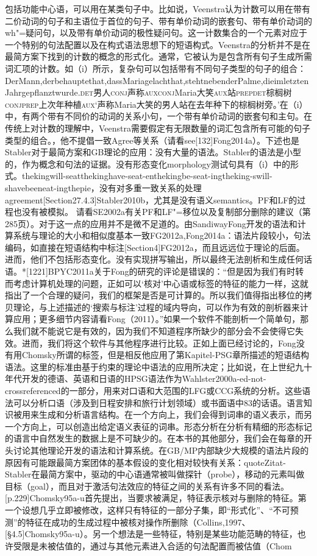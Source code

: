 包括功能中心语，可以用在某类句子中。比如说，Veenstra认为计数可以用在带有二价动词的句子和主语位于首位的句子、带有单价动词的嵌套句、带有单价动词的wh"=疑问句，以及带有单价动词的极性疑问句。这一计数集合的一个元素对应于一个特别的句法配置以及在构式语法思想下的短语构式。Veenstra的分析并不是在最简方案下找到的计数的概念的形式化。通常，它被认为是包含所有句子生成所需词汇项的计数。如（i）所示，复杂句可以包括带有不同句子类型的句子的组合：DerMann,derbehauptethat,dassMariagelachthat,stehtnebenderPalme,dieimletztenJahrgepflanztwurde.\textsc{det}男人\textsc{conj}声称\textsc{aux}\textsc{conj}Maria大笑\textsc{aux}站\textsc{prep}\textsc{det}棕榈树\textsc{conj}\textsc{prep}上次年种植\textsc{aux}`声称Maria大笑的男人站在去年种下的棕榈树旁。'在（i）中，有两个带有不同价的动词的关系小句，一个带有单价动词的嵌套句和主句。在传统上对计数的理解中，Veenstra需要假定有无限数量的词汇包含所有可能的句子类型的组合。，他不提倡一致Agree等关系（请看see[132]Fong2014a）。下述也是Stabler对于最简方案和GB理论的应用：没有大量的语法。Stabler的语法是小型的，作为概念和句法的证据。没有形态变化morphology测试句具有（i）中的形式。thekingwill-seatthekinghave-seat-enthekingbe-seat-ingtheking-swill-shavebeeneat-ingthepie，没有对多重一致关系的处理agreement[Section27.4.3]Stabler2010b，尤其是没有语义semantics。PF和LF的过程也没有被模拟。	请看SE2002a有关PF和LF"=移位以及复制部分删除的建议（第285页）。对于这一点的应用并不是微不足道的。由SandiwayFong开发的语法和计算系统与理论的大小和相似度基本一致FG2012a,Fong2014a：语法片段较小，句法编码，如直接在短语结构中标注[Section4]FG2012a，而且远远位于理论的后面。进而，他们不包括形态变化。没有实现拼写输出，所以最终无法剖析和生成任何话语。*[1221]BPYC2011a关于Fong的研究的评论是错误的：“但是因为我们有时转而考虑计算机处理的问题，正如可以‘核对’中心语或标签的特征的能力一样，这就指出了一个合理的疑问，我们的框架是否是可计算的。所以我们值得指出移位的拷贝理论，与上述描述的‘搜索与标注’过程的域内导向，可以作为有效的剖析器来计算应用；更多细节内容请看Fong（2011）。”如果一个软件不能剖析一个简单句，那么我们就不能说它是有效的，因为我们不知道程序所缺少的部分会不会使得它失效。进而，我们将这个软件与其他程序进行比较。正如上面已经讨论的，Fong没有用Chomsky所谓的标签，但是相反他应用了第Kapitel-PSG章所描述的短语结构语法。这里的标准由基于约束的理论中语法的应用所决定；比如说，在上世纪九十年代开发的德语、英语和日语的HPSG语法作为Wahlster2000a-ed-not-crossreferenced的一部分，用来对口语和大范围的LFG或CCG系统的分析。这些语法可以分析口语（涉及到日程安排和旅行计划领域）或书面语中83的话语。语言知识被用来生成和分析语言结构。在一个方向上，我们会得到词串的语义表示，而另一个方向上，可以创造出给定语义表征的词串。形态分析在分析有精细的形态标记的语言中自然发生的数据上是不可缺少的。在本书的其他部分，我们会在每章的开头讨论其他理论开发的语法和计算系统。在GB/MP内部缺少大规模的语法片段的原因有可能跟最简方案团体的基本假设的变化相对较快有关系：quoteZitat-Stabler在最简方案中，驱动的中心语通常被叫做探针（probe），移动的元素叫做目标（goal），而且对于激活句法效应的特征之间的关系有许多不同的看法。[p.229]Chomsky95a-u首先提出，当要求被满足，特征表示核对与删除的特征。第一个设想几乎立即被修改，这样只有特征的一部分子集，即“形式化”、“不可预测”的特征在成功的生成过程中被核对操作所删除（Collins,1997、[§4.5]Chomsky95a-u）。另一个想法是一些特征，特别是某些功能范畴的特征，也许受限是未被估值的，通过与其他元素进入合适的句法配置而被估值（Chom